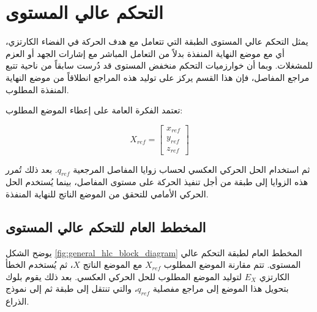 \section{التحكم عالي المستوى }
\label{sec:high_level_control}

يمثل التحكم عالي المستوى  الطبقة التي تتعامل مع هدف الحركة في الفضاء الكارتزي، أي مع موضع النهاية المنفذة بدلاً من التعامل المباشر مع إشارات الجهد أو العزم للمشغلات. وبما أن خوارزميات التحكم منخفض المستوى  قد دُرست سابقاً من ناحية تتبع مراجع المفاصل، فإن هذا القسم يركز على توليد هذه المراجع انطلاقاً من موضع النهاية المنفذة المطلوب.

تعتمد الفكرة العامة على إعطاء الموضع المطلوب:

\[
X_{ref} =
\begin{bmatrix}
x_{ref} \\
y_{ref} \\
z_{ref}
\end{bmatrix}
\]

ثم استخدام الحل الحركي العكسي  لحساب زوايا المفاصل المرجعية \(q_{ref}\). بعد ذلك تُمرر هذه الزوايا إلى طبقة  من أجل تنفيذ الحركة على مستوى المفاصل، بينما يُستخدم الحل الحركي الأمامي  للتحقق من الموضع الناتج للنهاية المنفذة.

\subsection{المخطط العام للتحكم عالي المستوى}
\label{subsec:general_hlc_diagram}

يوضح الشكل \ref{fig:general_hlc_block_diagram} المخطط العام لطبقة التحكم عالي المستوى. تتم مقارنة الموضع المطلوب \(X_{ref}\) مع الموضع الناتج \(X\)، ثم يُستخدم الخطأ الكارتزي \(E_X\)    لتوليد الموضع المطلوب للحل الحركي العكسي. بعد ذلك يقوم بلوك  بتحويل هذا الموضع إلى مراجع مفصلية \(q_{ref}\)، والتي تنتقل إلى طبقة  ثم إلى نموذج الذراع.

